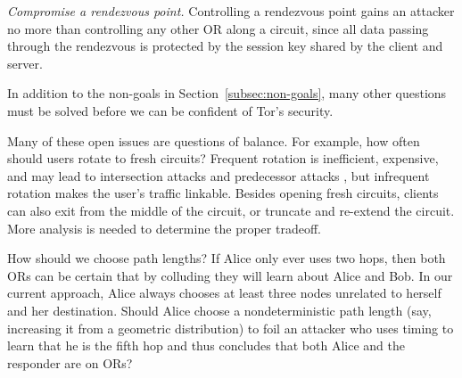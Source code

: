 \documentclass[times,10pt,twocolumn]{article}
\begin{document}
\emph{Compromise a rendezvous point.}  Controlling a rendezvous
point gains an attacker no more than controlling any other OR along
a circuit, since all data passing through the rendezvous is protected
by the session key shared by the client and server.

\label{sec:maintaining-anonymity}
 
In addition to the non-goals in
Section~\ref{subsec:non-goals}, many other questions must be solved
before we can be confident of Tor's security.

Many of these open issues are questions of balance. For example,
how often should users rotate to fresh circuits? Frequent rotation
is inefficient, expensive, and may lead to intersection attacks and
predecessor attacks \cite{wright03}, but infrequent rotation makes the
user's traffic linkable. Besides opening fresh circuits, clients can
also exit from the middle of the circuit,
or truncate and re-extend the circuit. More analysis is
needed to determine the proper tradeoff.

%

How should we choose path lengths? If Alice only ever uses two hops,
then both ORs can be certain that by colluding they will learn about
Alice and Bob. In our current approach, Alice always chooses at least
three nodes unrelated to herself and her destination.
%
Should Alice choose a nondeterministic path length (say,
increasing it from a geometric distribution) to foil an attacker who
uses timing to learn that he is the fifth hop and thus concludes that
both Alice and the responder are on ORs?
\end{document}
